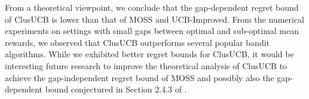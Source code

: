 
From a theoretical viewpoint, we conclude that the gap-dependent regret bound of ClusUCB is lower than that of MOSS and UCB-Improved. From the numerical experiments on settings with small gaps between optimal and sub-optimal mean rewards, we observed that ClusUCB outperforms several popular bandit algorithms. 
While we exhibited better regret bounds for ClusUCB, it would be interesting future research to improve the theoretical analysis of ClusUCB to achieve the gap-independent regret bound of MOSS and possibly also the gap-dependent bound conjectured in Section 2.4.3 of \cite{bubeck2012regret}.